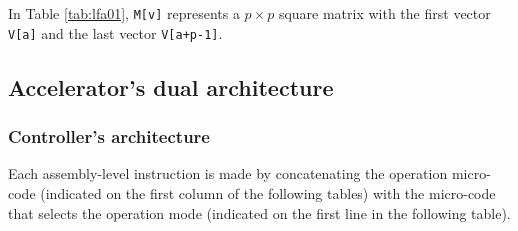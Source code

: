 In Table \ref{tab:lfa01}, {\tt M[v]} represents a $p \times p$ square matrix  with the first vector {\tt V[a]} and the last vector {\tt V[a+p-1]}.

\subsection{Accelerator's dual architecture}

\subsubsection{Controller's architecture}

Each assembly-level instruction is made by concatenating the operation micro-code (indicated on the first column of the following tables) with the micro-code that selects the operation mode (indicated on the first line in the following table).


